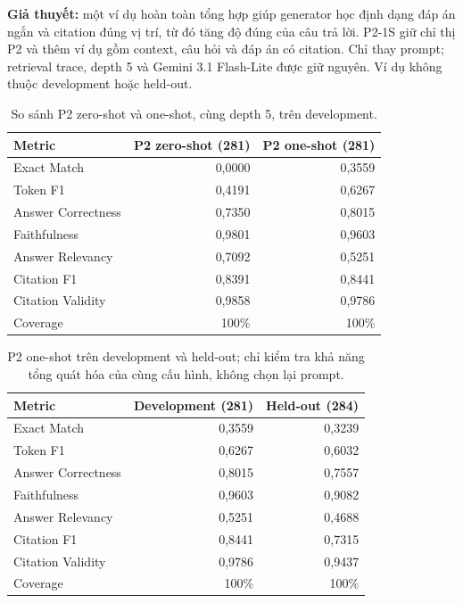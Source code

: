 \textbf{Giả thuyết:} một ví dụ hoàn toàn tổng hợp giúp generator học định dạng
đáp án ngắn và citation đúng vị trí, từ đó tăng độ đúng của câu trả lời. P2-1S
giữ chỉ thị P2 và thêm ví dụ gồm context, câu hỏi và đáp án có citation. Chỉ
thay prompt; retrieval trace, depth 5 và Gemini 3.1 Flash-Lite được giữ nguyên.
Ví dụ không thuộc development hoặc held-out.

\begin{table}[H]
  \centering
  \caption{So sánh P2 zero-shot và one-shot, cùng depth 5, trên development.}
  \label{tab:phase2-one-shot}
  \small
  \begin{tabular}{lrr}
    \toprule
    \textbf{Metric} & \textbf{P2 zero-shot (281)} & \textbf{P2 one-shot (281)} \\
    \midrule
    Exact Match & 0,0000 & 0,3559 \\
    Token F1 & 0,4191 & 0,6267 \\
    Answer Correctness & 0,7350 & 0,8015 \\
    Faithfulness & 0,9801 & 0,9603 \\
    Answer Relevancy & 0,7092 & 0,5251 \\
    Citation F1 & 0,8391 & 0,8441 \\
    Citation Validity & 0,9858 & 0,9786 \\
    Coverage & 100\% & 100\% \\
    \bottomrule
  \end{tabular}
\end{table}

\begin{table}[H]
  \centering
  \caption{P2 one-shot trên development và held-out; chỉ kiểm tra khả năng
  tổng quát hóa của cùng cấu hình, không chọn lại prompt.}
  \label{tab:phase2-one-shot-heldout}
  \small
  \begin{tabular}{lrr}
    \toprule
    \textbf{Metric} & \textbf{Development (281)} & \textbf{Held-out (284)} \\
    \midrule
    Exact Match & 0,3559 & 0,3239 \\
    Token F1 & 0,6267 & 0,6032 \\
    Answer Correctness & 0,8015 & 0,7557 \\
    Faithfulness & 0,9603 & 0,9082 \\
    Answer Relevancy & 0,5251 & 0,4688 \\
    Citation F1 & 0,8441 & 0,7315 \\
    Citation Validity & 0,9786 & 0,9437 \\
    Coverage & 100\% & 100\% \\
    \bottomrule
  \end{tabular}
\end{table}

